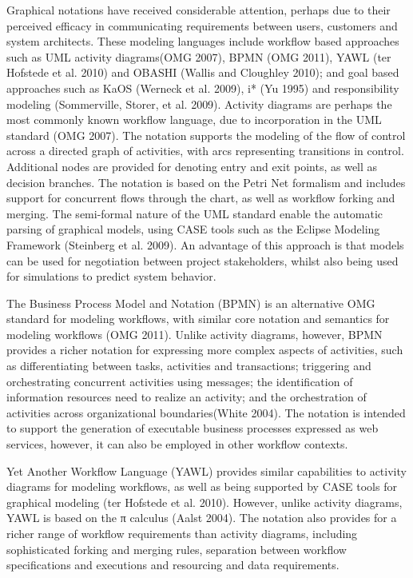 \documentclass{llncs}
\begin{document}
Graphical notations have received considerable attention, perhaps due to their perceived efficacy in communicating
requirements between users, customers and system architects.  These modeling languages include workflow based approaches
such as UML activity diagrams(OMG 2007), BPMN (OMG 2011), YAWL (ter Hofstede et al. 2010) and OBASHI (Wallis and
Cloughley 2010); and goal based approaches such as KaOS (Werneck et al. 2009), i* (Yu 1995) and responsibility modeling
(Sommerville, Storer, et al. 2009).  Activity diagrams are perhaps the most commonly known workflow language, due to
incorporation in the UML standard (OMG 2007).  The notation supports the modeling of the flow of control across a
directed graph of activities, with arcs representing transitions in control.  Additional nodes are provided for denoting
entry and exit points, as well as decision branches.  The notation is based on the Petri Net formalism and includes
support for concurrent flows through the chart, as well as workflow forking and merging. The semi-formal nature of the
UML standard enable the automatic parsing of graphical models, using CASE tools such as the Eclipse Modeling Framework
(Steinberg et al. 2009).  An advantage of this approach is that models can be used for negotiation between project
stakeholders, whilst also being used for simulations to predict system behavior.

The Business Process Model and Notation (BPMN) is an alternative OMG standard for modeling workflows, with similar core
notation and semantics for modeling workflows (OMG 2011).  Unlike activity diagrams, however, BPMN provides a richer
notation for expressing more complex aspects of activities, such as differentiating between tasks, activities and
transactions; triggering and orchestrating concurrent activities using messages; the identification of information
resources need to realize an activity; and the orchestration of activities across organizational boundaries(White 2004).
The notation is intended to support the generation of executable business processes expressed as web services, however,
it can also be employed in other workflow contexts.

Yet Another Workflow Language (YAWL) provides similar capabilities to activity diagrams for modeling workflows, as well
as being supported by CASE tools for graphical modeling (ter Hofstede et al. 2010).  However, unlike activity diagrams,
YAWL is based on the π calculus (Aalst 2004).  The notation also provides for a richer range of workflow requirements
than activity diagrams, including sophisticated forking and merging rules, separation between workflow specifications
and executions and resourcing and data requirements.
\end{document}
